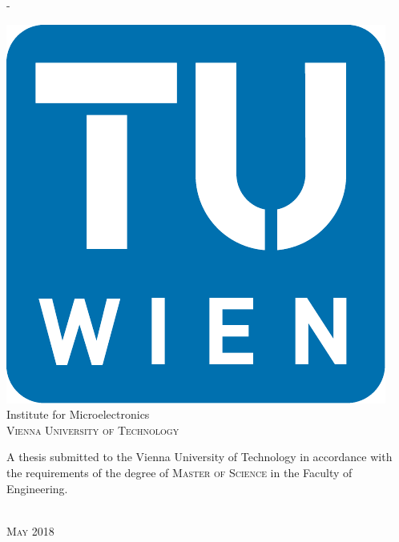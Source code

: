 \begin{titlingpage}
\begin{SingleSpace}
\begin{adjustwidth*}{\unitlength}{-\unitlength}
\begin{center}
\includegraphics[scale=0.5]{logos/TU_Signet}\\
\vspace{6mm}
{\large Institute for Microelectronics\\
\textsc{Vienna University of Technology}}\\
\vspace{11mm}
\begin{minipage}{10cm}
A thesis submitted to the Vienna University of Technology in accordance with the requirements of the degree of \textsc{Master of Science} in the Faculty of Engineering.
\end{minipage}\\
\vspace{9mm}
{\large\textsc{May 2018}}
\vspace{12mm}
\end{center}
\begin{flushright}
\end{flushright}
\end{adjustwidth*}
\end{SingleSpace}
\end{titlingpage}